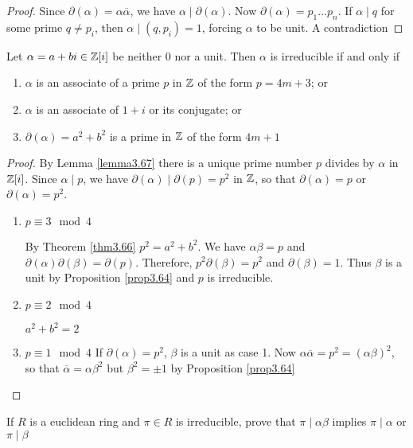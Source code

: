 \documentclass[11pt]{article}
\begin{document}
\begin{proof}
Since \(\partial(\alpha)=\alpha\overline{\alpha}\), we have \(\alpha\mid\partial(\alpha)\). Now
\(\partial(\alpha)=p_1\dots p_n\). If \(\alpha\mid q\) for some prime \(q\neq p_i\), then 
\(\alpha\mid(q,p_i)=1\), forcing \(\alpha\) to be unit. A contradiction
\end{proof}

\begin{proposition}[]
Let \(\alpha=a+bi\in\mathbb{Z}[i]\) be neither 0 nor a unit. Then \(\alpha\) is irreducible if
and only if
\begin{enumerate}
\item \(\alpha\) is an associate of a prime \(p\) in \(\mathbb{Z}\) of the form \(p=4m+3\); or
\item \(\alpha\) is an associate of \(1+i\) or its conjugate; or
\item \(\partial(\alpha)=a^2+b^2\) is a prime in \(\mathbb{Z}\) of the form \(4m+1\)
\end{enumerate}
\end{proposition}

\begin{proof}
By Lemma \ref{lemma3.67} there is a unique prime number \(p\) divides by \(\alpha\) in
\(\mathbb{Z}[i]\). Since \(\alpha\mid p\), we have \(\partial(\alpha)\mid\partial(p)=p^2\) in
\(\mathbb{Z}\), so that \(\partial(\alpha)=p\) or \(\partial(\alpha)=p^2\).
\begin{enumerate}
\item \(p\equiv 3\mod4\)

By Theorem \ref{thm3.66} \(p^2=a^2+b^2\). We have \(\alpha\beta=p\) and
\(\partial(\alpha)\partial(\beta)=\partial(p)\). Therefore, \(p^2\partial(\beta)=p^2\) and
\(\partial(\beta)=1\). Thus \(\beta\) is a unit by Proposition \ref{prop3.64} and \(p\) is
irreducible.
\item \(p\equiv 2\mod 4\)

\(a^2+b^2=2\)
\item \(p\equiv1\mod4\)
If \(\partial(\alpha)=p^2\), \(\beta\) is a unit as case 1. Now 
\(\alpha\overline{\alpha}=p^2=(\alpha\beta)^2\), so that
\(\overline{\alpha}=\alpha\beta^2\) but \(\beta^2=\pm1\) by Proposition \ref{prop3.64}
\end{enumerate}
\end{proof}

\begin{exercise}
\label{ex3.62}
If \(R\) is a euclidean ring and \(\pi\in R\) is irreducible, prove that 
\(\pi\mid\alpha\beta\) implies \(\pi\mid\alpha\) or \(\pi\mid\beta\)
\end{exercise}
\end{document}
